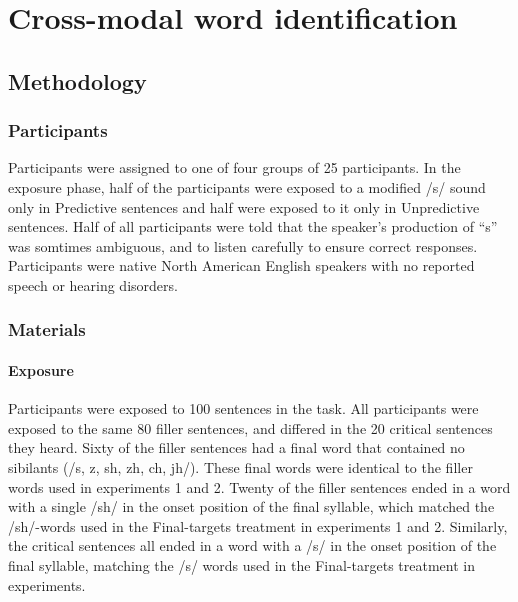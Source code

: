 
\chapter{Cross-modal word identification}

\section{Methodology}

\subsection{Participants}

Participants were assigned to one of four groups of 25 participants.  In the exposure phase, half of the participants were exposed to a modified /s/ sound only in Predictive sentences and half were exposed to it only in Unpredictive sentences.  Half of all participants were told that the speaker's production of ``s'' was somtimes ambiguous, and to listen carefully to ensure correct responses.  Participants were native North American English speakers with no reported speech or hearing disorders.

\subsection{Materials}

\subsubsection{Exposure}

Participants were exposed to 100 sentences in the task.  All participants were exposed to the same 80 filler sentences, and differed in the 20 critical sentences they heard.  Sixty of the filler sentences had a final word that contained no sibilants  (/s, z, sh, zh, ch, jh/).  These final words were identical to the filler words used in experiments 1 and 2.  Twenty of the filler sentences ended in a word with a single /sh/ in the onset position of the final syllable, which matched the /sh/-words used in the Final-targets treatment in experiments 1 and 2.  Similarly, the critical sentences all ended in a word with a /s/ in the onset position of the final syllable, matching the /s/ words used in the Final-targets treatment in experiments.

